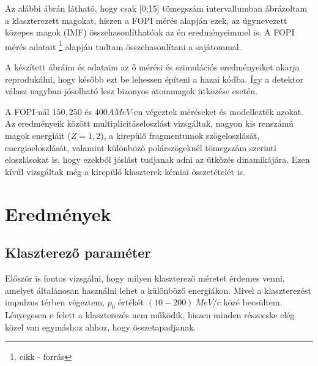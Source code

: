 \documentclass[a4paper,12pt]{article}
\begin{document}
\par Az alábbi ábrán látható, hogy csak [0;15] tömegszám intervallumban ábrázoltam a klaszterezett magokat, hiszen a FOPI mérés alapján ezek, az úgynevezett közepes magok (IMF) összehasonlíthatóak az én eredményeimmel is. A FOPI mérés adatait \footnote{cikk - forrás} alapján tudtam összehasonlítani a sajátommal.

\vspace{5mm}

\par A készített ábráim és adataim az ő mérési és szimulációs eredményeiket akarja reprodukálni, hogy később ezt be lehessen építeni a hazai kódba. Így a detektor válasz nagyban jósolható lesz bizonyos atommagok ütközése esetén.

\vspace{5mm}

\par A FOPI-nál $150, 250$ és $400 A MeV$-en végeztek méréseket és modellezték azokat. Az eredményeik között multiplicitáseloszlást vizsgáltak, nagyon kis renszámú magok energiáit ($ Z = 1,2$), a kirepülő fragmentumok szögeloszlását, energiaeloszlását, valamint különböző polárszögeknél tömegszám szerinti eloszlásokat is, hogy ezekből jóslást tudjanak adni az ütközés dinamikájára. Ezen kívül vizsgáltak még a kirepülő klaszterek kémiai összetételét is. 

\newpage

\section{ Eredmények}

\vspace{5mm}

\subsection{Klaszterező paraméter}

\vspace{5mm}

\par Először is fontos vizsgálni, hogy milyen klaszterező méretet érdemes venni, amelyet általánosan használni lehet a különböző energiákon. Mivel a klaszterezést impulzus térben végeztem, $p_{0}$ értékét $(10 - 200) ~MeV/c$ közé becsültem. Lényegesen e felett a klaszterezés nem működik, hiszen minden részecske elég közel van egymáshoz ahhoz, hogy összetapadjanak. 

\vspace{5mm}
\end{document}

